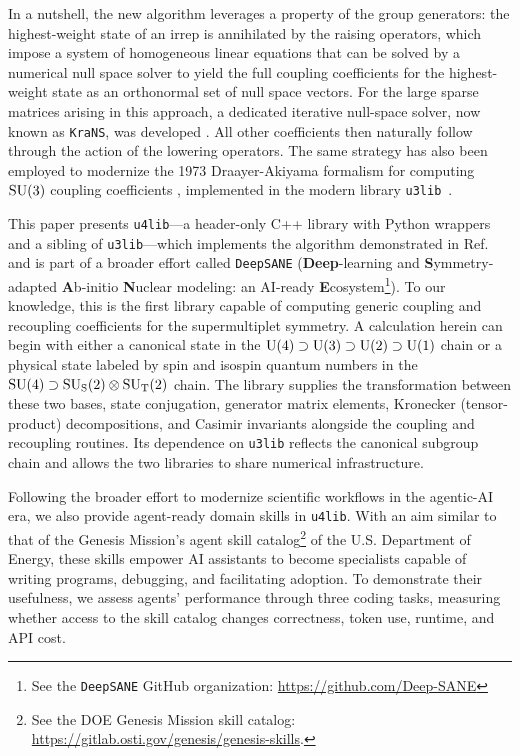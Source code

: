 \documentclass[aps,onecolumn,10pt,superscriptaddress,floatfix,nofootinbib]{revtex4}
\begin{document}
In a nutshell, the new algorithm leverages a property of the group generators:
the highest-weight state of an irrep is annihilated by the raising operators,
which impose a system of homogeneous linear equations that can be solved
by a numerical null space solver
to yield the full coupling coefficients for the highest-weight state as an orthonormal set of
null space vectors. For the large sparse matrices arising in this approach,
a dedicated iterative null-space solver, now known as
\texttt{KraNS}, was developed \cite{Krastenov2026MSc}.
All other coefficients then naturally follow through the action
of the lowering operators. The same strategy has also been employed to modernize
the 1973 Draayer-Akiyama formalism \cite{Draayer1973JMP,Akiyama1973CPC}
for computing $\rm SU(3)$ coupling coefficients \cite{Dang2024EPJP1},
implemented in the modern library \texttt{u3lib}~\cite{Langr2026u3lib}.

This paper presents \texttt{u4lib}---a header-only C++ library with Python wrappers 
and a sibling of \texttt{u3lib}---which implements the algorithm demonstrated in
Ref.~\cite{Dang2024EPJP2} and is part of a broader effort called \texttt{DeepSANE} 
(\textbf{Deep}-learning and \textbf{S}ymmetry-adapted \textbf{A}b-initio \textbf{N}uclear 
modeling: an AI-ready \textbf{E}cosystem\footnote{See the \texttt{DeepSANE} GitHub organization: 
\url{https://github.com/Deep-SANE}}). To our knowledge, this is the first library capable of
computing generic coupling and recoupling coefficients for the supermultiplet symmetry.
A calculation herein can begin with  either a canonical state in the 
$\rm U(4) \supset U(3) \supset U(2) \supset U(1)$ chain 
or a physical state labeled by spin and isospin quantum numbers in the
$\rm SU(4) \supset SU_S(2)\otimes SU_T(2)$ chain. The library supplies the
transformation between these two bases, state conjugation, generator matrix elements,
Kronecker (tensor-product) decompositions, and Casimir invariants alongside the
coupling and recoupling routines. Its dependence on \texttt{u3lib} reflects the canonical
subgroup chain and allows the two libraries to share numerical infrastructure.

Following the broader effort to modernize scientific workflows in the agentic-AI era,
we also provide agent-ready domain skills in \texttt{u4lib}. With an aim similar to that of
the Genesis Mission's agent skill catalog\footnote{See the DOE Genesis
Mission skill catalog: \url{https://gitlab.osti.gov/genesis/genesis-skills}.} of 
the U.S. Department of Energy, these skills empower AI assistants to become
specialists capable of writing programs, debugging, and facilitating adoption.
To demonstrate their usefulness, we assess agents' performance through three coding tasks, 
measuring whether access to the skill catalog changes correctness, token use, runtime, and API cost.
\end{document}
